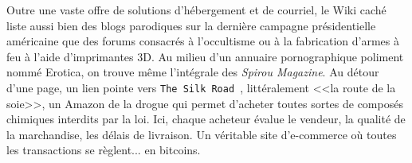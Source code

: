 \documentclass[11pt,twoside,a4paper]{article}
\begin{document}
	Outre une vaste offre de solutions d'h{\'e}bergement et de courriel, le Wiki cach{\'e} liste aussi bien des blogs parodiques sur la derni{\`e}re campagne pr{\'e}sidentielle am{\'e}ricaine que des forums consacr{\'e}s {\`a} l'occultisme ou {\`a} la fabrication d'armes {\`a} feu {\`a} l'aide d'imprimantes 3D. Au milieu d'un annuaire pornographique poliment nomm{\'e} Erotica, on trouve m{\^e}me l'int{\'e}grale des \emph{Spirou Magazine}. Au d{\'e}tour d'une page, un lien pointe vers \texttt{The Silk Road~\footnotemark }, litt{\'e}ralement <<la route de la soie>>, un Amazon de la drogue qui permet d'acheter toutes sortes de compos{\'e}s chimiques interdits par la loi. Ici, chaque acheteur {\'e}value le vendeur, la qualit{\'e} de la marchandise, les d{\'e}lais de livraison. Un v{\'e}ritable site d'e-commerce o{\`u} toutes les transactions se r{\`e}glent... en bitcoins. ~\\
\end{document}
